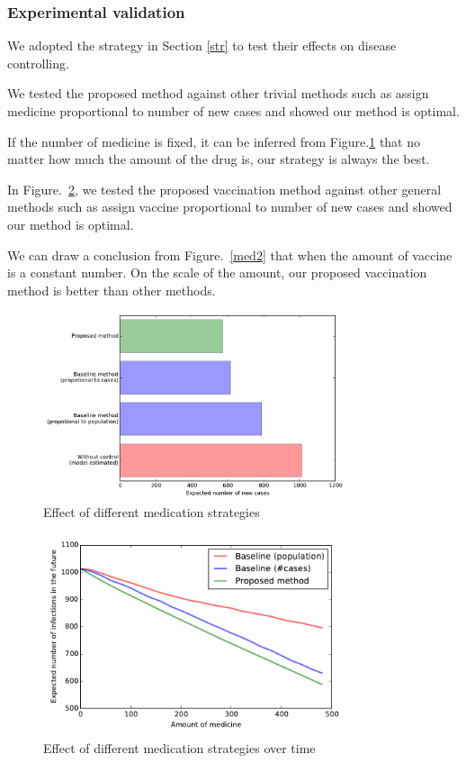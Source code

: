 \documentclass[11pt]{article}
\begin{document}
\subsubsection{Experimental validation}

We adopted the strategy in Section \ref{str} to test their effects on disease controlling.

We tested the proposed method against other trivial methods such as assign medicine proportional to number of new cases and showed our method is optimal.

If the number of medicine is fixed, it can be inferred from Figure.\ref{med} that no matter how much the amount of the drug is, our strategy is always the best.

In Figure.~\ref{ev}, we tested the proposed vaccination method against other general methods such as assign vaccine proportional to number of new cases and showed our method is optimal.

We can draw a conclusion from Figure.~\ref{med2} that when the amount of vaccine is a constant number. On the scale of the amount, our proposed vaccination method is better than other methods.




\begin{figure}[hbtp]
\begin{center}
  \includegraphics[width=3.5in]{graph/res2.pdf}
  \caption{Effect of different medication strategies}
  \label{med}
\end{center}  
\end{figure}


\begin{figure}[hbtp]
\begin{center}
  \includegraphics[width=3.5in]{graph/ev.pdf}
  \caption{Effect of different medication strategies over time}
  \label{ev}
\end{center}  
\end{figure}
\end{document}
